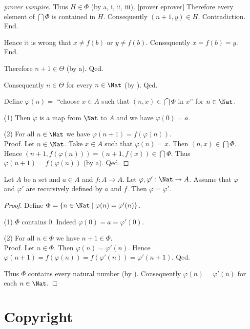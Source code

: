 \documentclass{article}
\begin{document}
\begin{forthel}
\begin{proof}
              [prover vampire]
              Thus $H \in \Phi$ (by a, i, ii, iii).
              [prover eprover]
              Therefore every element of $\bigcap \Phi$ is contained in $H$.
              Consequently $(n + 1,y) \in H$.
              Contradiction.
            End.

            Hence it is wrong that $x \neq f(b)$ or $y \neq f(b)$.
            Consequently $x = f(b) = y$.
          End.

          Therefore $n + 1 \in \Theta$ (by a).
        Qed.

        Consequently $n \in \Theta$ for every $n \in \Nat$ (by ).
      Qed.

      Define $\varphi(n) =$ ``choose $x \in A$ such that $(n, x) \in
      \bigcap \Phi$ in $x$'' for $n \in \Nat$.

      (1) Then $\varphi$ is a map from $\Nat$ to $A$ and we have
      $\varphi(0) = a$.

      (2) For all $n \in \Nat$ we have $\varphi(n + 1) =
      f(\varphi(n))$. \\
      Proof.
        Let $n \in \Nat$.
        Take $x \in A$ such that $\varphi(n) = x$.
        Then $(n, x) \in \bigcap \Phi$.
        Hence $(n + 1, f(\varphi(n))) = (n + 1, f(x)) \in \bigcap \Phi$.
        Thus $\varphi(n + 1) = f(\varphi(n))$ (by a).
      Qed.
    \end{proof}
  \end{forthel}

  \begin{forthel}
    \begin{theorem*}[title=Dedekind's Recursion Theorem: Uniqueness,id=dedekind_uniqueness]
      Let $A$ be a set and $a \in A$ and $f : A \to A$.
      Let $\varphi, \varphi' : \Nat \to A$.
      Assume that $\varphi$ and $\varphi'$ are recursively defined by $a$ and
      $f$.
      Then $\varphi = \varphi'$.
    \end{theorem*}
    \begin{proof}
      Define $\Phi = \{ n \in \Nat \mid \varphi(n) = \varphi'(n) \}$.

      (1) $\Phi$ contains $0$.
      Indeed $\varphi(0) = a = \varphi'(0)$.

      (2) For all $n \in \Phi$ we have $n + 1 \in \Phi$. \\
      Proof.
        Let $n \in \Phi$.
        Then $\varphi(n) = \varphi'(n)$.
        Hence $\varphi(n + 1)
          = f(\varphi(n))
          = f(\varphi'(n))
          = \varphi'(n + 1)$.
      Qed.

      Thus $\Phi$ contains every natural number (by ).
      Consequently $\varphi(n) = \varphi'(n)$ for each $n \in \Nat$.
    \end{proof}
  \end{forthel}

  \printbibliography

  \section*{Copyright}
  \doclicenseThis
\end{document}

